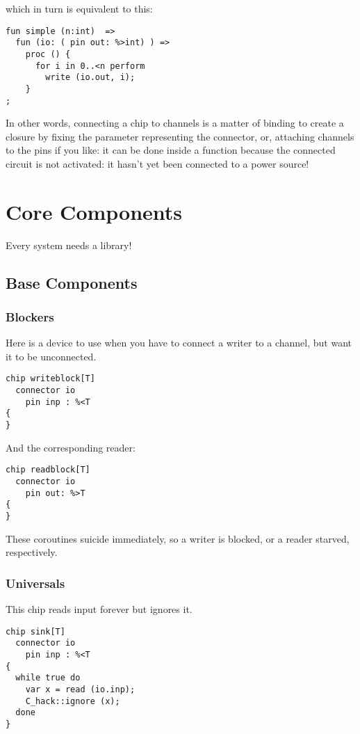 \documentclass[oneside]{book}
\begin{document}
which in turn is equivalent to this:

\begin{verbatim}
fun simple (n:int)  =>
  fun (io: ( pin out: %>int) ) =>
    proc () {
      for i in 0..<n perform 
        write (io.out, i);
    }
;
\end{verbatim}

In other words, connecting a chip to channels is a matter of
binding to create a closure by fixing the parameter
representing the connector, or, attaching channels to
the pins if you like: it can be done inside a function
because the connected circuit is not activated: it
hasn't yet been connected to a power source!


\chapter{Core Components}
Every system needs a library! 
\section{Base Components}
\subsection{Blockers}
Here is a device to use when you have to connect
a writer to a channel, but want it to be unconnected.

\begin{verbatim}
chip writeblock[T]
  connector io
    pin inp : %<T
{
}
\end{verbatim}

And the corresponding reader:

\begin{verbatim}
chip readblock[T]
  connector io
    pin out: %>T
{
}
\end{verbatim}

These coroutines suicide immediately, so a writer is blocked,
or a reader starved, respectively.

\subsection{Universals}
This chip reads input forever but ignores it.

\begin{verbatim}
chip sink[T]
  connector io
    pin inp : %<T
{
  while true do
    var x = read (io.inp);
    C_hack::ignore (x);
  done
}
\end{verbatim}
\end{document}
